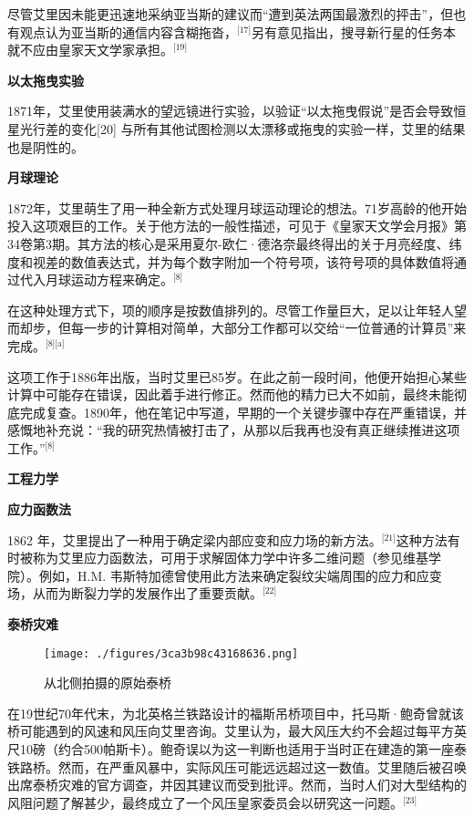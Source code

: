 尽管艾里因未能更迅速地采纳亚当斯的建议而“遭到英法两国最激烈的抨击”，但也有观点认为亚当斯的通信内容含糊拖沓，\(^\text{[17]}\)另有意见指出，搜寻新行星的任务本就不应由皇家天文学家承担。\(^\text{[19]}\)

\textbf{以太拖曳实验}

1871年，艾里使用装满水的望远镜进行实验，以验证“以太拖曳假说”是否会导致恒星光行差的变化[20] 与所有其他试图检测以太漂移或拖曳的实验一样，艾里的结果也是阴性的。

\textbf{月球理论}

1872年，艾里萌生了用一种全新方式处理月球运动理论的想法。71岁高龄的他开始投入这项艰巨的工作。关于他方法的一般性描述，可见于《皇家天文学会月报》第34卷第3期。其方法的核心是采用夏尔-欧仁·德洛奈最终得出的关于月亮经度、纬度和视差的数值表达式，并为每个数字附加一个符号项，该符号项的具体数值将通过代入月球运动方程来确定。\(^\text{[8]}\)

在这种处理方式下，项的顺序是按数值排列的。尽管工作量巨大，足以让年轻人望而却步，但每一步的计算相对简单，大部分工作都可以交给“一位普通的计算员”来完成。\(^\text{[8][a]}\)

这项工作于1886年出版，当时艾里已85岁。在此之前一段时间，他便开始担心某些计算中可能存在错误，因此着手进行修正。然而他的精力已大不如前，最终未能彻底完成复查。1890年，他在笔记中写道，早期的一个关键步骤中存在严重错误，并感慨地补充说：“我的研究热情被打击了，从那以后我再也没有真正继续推进这项工作。”\(^\text{[8]}\)

\textbf{工程力学}

\textbf{应力函数法}

1862 年，艾里提出了一种用于确定梁内部应变和应力场的新方法。\(^\text{[21]}\)这种方法有时被称为艾里应力函数法，可用于求解固体力学中许多二维问题（参见维基学院）。例如，H.M. 韦斯特加德曾使用此方法来确定裂纹尖端周围的应力和应变场，从而为断裂力学的发展作出了重要贡献。\(^\text{[22]}\)

\textbf{泰桥灾难}
\begin{figure}[ht]
\centering
\texttt{[image: ./figures/3ca3b98c43168636.png]}
\caption{从北侧拍摄的原始泰桥} \label{fig_AL_7}
\end{figure}
在19世纪70年代末，为北英格兰铁路设计的福斯吊桥项目中，托马斯·鲍奇曾就该桥可能遇到的风速和风压向艾里咨询。艾里认为，最大风压大约不会超过每平方英尺10磅（约合500帕斯卡）。鲍奇误以为这一判断也适用于当时正在建造的第一座泰铁路桥。然而，在严重风暴中，实际风压可能远远超过这一数值。艾里随后被召唤出席泰桥灾难的官方调查，并因其建议而受到批评。然而，当时人们对大型结构的风阻问题了解甚少，最终成立了一个风压皇家委员会以研究这一问题。\(^\text{[23]}\)

